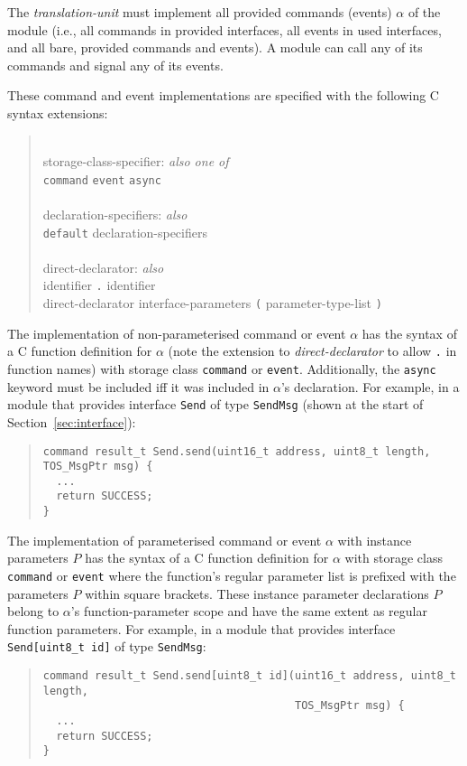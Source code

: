 \documentclass[11pt,letterpaper]{article}
\newcommand{\kw}[1]{{\tt #1}}
\newcommand{\code}[1]{{\tt #1}}
\newcommand{\grammarshift}{\vspace*{-.7cm}}
\newcommand{\grammarindent}{\hspace*{2cm}\= \\ \kill}
\begin{document}
The \emph{translation-unit} must implement all provided commands
(events) $\alpha$ of the module (i.e., all commands in provided
interfaces, all events in used interfaces, and all bare, provided
commands and events). A module can call any of its commands and
signal any of its events.

These command and event implementations are specified with the following C
syntax extensions:
\begin{quote} \grammarshift \em \begin{tabbing}
\grammarindent
storage-class-specifier: \emph{also one of}\\
\>	\kw{command} \kw{event} \kw{async}\\
\\
declaration-specifiers: \emph{also}\\
\>	\kw{default} declaration-specifiers\\
\\
direct-declarator: \emph{also}\\
\>	identifier \kw{.} identifier \\
\>	direct-declarator interface-parameters \kw{(} parameter-type-list \kw{)}\\
\end{tabbing} \end{quote}
The implementation of non-parameterised command or event $\alpha$ has the
syntax of a C function definition for $\alpha$ (note the extension to
\emph{direct-declarator} to allow \code{.} in function names) with storage
class \kw{command} or \kw{event}. Additionally, the \kw{async} keyword must
be included iff it was included in $\alpha$'s declaration. For example, in
a module that provides interface \code{Send} of type \kw{SendMsg} (shown at
the start of Section~\ref{sec:interface}):
\begin{quote} \begin{verbatim}
command result_t Send.send(uint16_t address, uint8_t length, TOS_MsgPtr msg) {
  ...
  return SUCCESS;
}
\end{verbatim} \end{quote}

The implementation of parameterised command or event $\alpha$ with
instance parameters $P$ has the syntax of a C function definition for
$\alpha$ with storage class \kw{command} or \kw{event} where the
function's regular parameter list is prefixed with the parameters $P$
within square brackets. These instance parameter declarations
$P$ belong to $\alpha$'s function-parameter scope and have the same
extent as regular function parameters. For example, in a module that
provides interface \code{Send[uint8\_t id]} of type \kw{SendMsg}:
\begin{quote} \begin{verbatim}
command result_t Send.send[uint8_t id](uint16_t address, uint8_t length, 
                                       TOS_MsgPtr msg) {
  ...
  return SUCCESS;
}
\end{verbatim} \end{quote}
\end{document}
